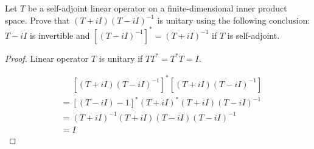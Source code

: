 \begin{homeworkProblem}

Let $T$ be a self-adjoint linear operator on a finite-dimensional inner product
space. Prove that $(T + iI)(T - iI)^{-1}$ is unitary using the following conclusion:
$T - iI$ is invertible and $[(T -iI)^{-1}]^* = (T + iI)^{-1}$ if $T$ is self-adjoint.

\solution

\begin{proof}
Linear operator $T$ is unitary if $TT^* = T^*T = I$.

\[
\begin{aligned}
&\phantom{= } [(T + iI)(T - iI)^{-1}]^*[(T + iI)(T - iI)^{-1}]\\
&= [(T-iI)-1]^*(T+iI)^*(T+iI)(T-iI)^{-1}\\
&= (T+iI)^{-1}(T+iI)(T-iI)(T-iI)^{-1}\\
&=I
\end{aligned}
\]
\end{proof}
\end{homeworkProblem}
